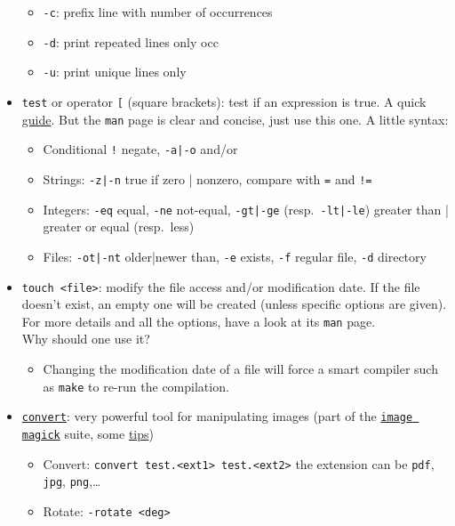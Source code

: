 \documentclass[a4paper,12pt,%
              final%
              ]{article}
\begin{document}
\begin{itemize}
    \begin{itemize}
      \item \verb|-c|: prefix line with number of occurrences
      \item \verb|-d|: print repeated lines only occ
      \item \verb|-u|: print unique lines only
    \end{itemize}
  \item \texttt{test} or operator \verb|[| (square brackets): test if an expression is true. A quick \href{https://www.computerhope.com/unix/test.htm}{guide}. But the \texttt{man} page is clear and concise, just use this one. A little syntax:
    \begin{itemize}
      \item Conditional \verb|!| negate, \verb!-a|-o! and/or
      \item Strings: \verb!-z|-n! true if zero | nonzero, compare with \verb|=| and \verb|!=|
      \item Integers: \verb|-eq| equal, \verb|-ne| not-equal, \verb!-gt|-ge! (resp.~\verb!-lt|-le!) greater than | greater or equal (resp.~less)
      \item Files: \verb!-ot|-nt! older|newer than, \verb|-e| exists, \verb|-f| regular file, \verb|-d| directory
    \end{itemize}
  \item \verb|touch <file>|: modify the file access and/or modification date. If the file doesn't exist, an empty one will be created (unless specific options are given). For more details and all the options, have a look at its \texttt{man} page.\\
  Why should one use it?
    \begin{itemize}
      \item Changing the modification date of a file will force a smart compiler such as \verb|make| to re-run the compilation.
    \end{itemize}
  \item \href{http://www.imagemagick.org/script/convert.php}{\texttt{convert}}: very powerful tool for manipulating images (part of the \href{https://imagemagick.org/index.php}{\texttt{image magick}} suite, some \href{http://www.imagemagick.org/script/command-line-processing.php}{tips})
    \begin{itemize}
      \item Convert: \verb|convert test.<ext1> test.<ext2>| the extension can be \texttt{pdf}, \texttt{jpg}, \texttt{png},\ldots
      \item Rotate: \verb|-rotate <deg>|

\end{itemize}
\end{itemize}
\end{document}
